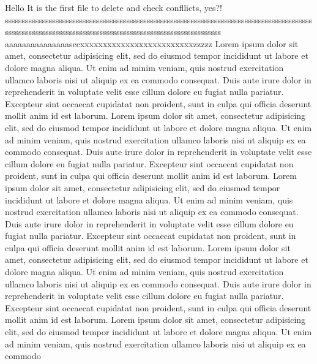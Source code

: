 Hello
It is the
first file
to delete and check confllicts, yes?!
\begin{equation}
    
\end{equation}
sssssssssssssssssssssssssssssssssssssssssssssssssssssssssssssssssssssssssssssssssssssssssssssssssssssssssssssssssssssssssssssssssssssssssssssssssssssssssss aaaaaaaaaaaaaaasccxxxxxxxxxxxxxxxxxxxxxxxxxzzzzz
       Lorem ipsum dolor sit amet, consectetur adipisicing elit, sed do eiusmod
       tempor incididunt ut labore et dolore magna aliqua. Ut enim ad minim veniam,
       quis nostrud exercitation ullamco laboris nisi ut aliquip ex ea commodo
       consequat. Duis aute irure dolor in reprehenderit in voluptate velit esse
       cillum dolore eu fugiat nulla pariatur. Excepteur sint occaecat cupidatat non
proident, sunt in culpa qui officia deserunt mollit anim id est laborum.
Lorem ipsum dolor sit amet, consectetur adipisicing elit, sed do eiusmod
tempor incididunt ut labore et dolore magna aliqua. Ut enim ad minim veniam,
       quis nostrud exercitation ullamco laboris nisi ut aliquip ex ea commodo
       consequat. Duis aute irure dolor in reprehenderit in voluptate velit esse
       cillum dolore eu fugiat nulla pariatur. Excepteur sint occaecat cupidatat non
       proident, sunt in culpa qui officia deserunt mollit anim id est laborum.
       Lorem ipsum dolor sit amet, consectetur adipisicing elit, sed do eiusmod
       tempor incididunt ut labore et dolore magna aliqua. Ut enim ad minim veniam,
       quis nostrud exercitation ullamco laboris nisi ut aliquip ex ea commodo
       consequat. Duis aute irure dolor in reprehenderit in voluptate velit esse
       cillum dolore eu fugiat nulla pariatur. Excepteur sint occaecat cupidatat non
       proident, sunt in culpa qui officia deserunt mollit anim id est laborum.
       Lorem ipsum dolor sit amet, consectetur adipisicing elit, sed do eiusmod
       tempor incididunt ut labore et dolore magna aliqua. Ut enim ad minim veniam,
       quis nostrud exercitation ullamco laboris nisi ut aliquip ex ea commodo
       consequat. Duis aute irure dolor in reprehenderit in voluptate velit esse
       cillum dolore eu fugiat nulla pariatur. Excepteur sint occaecat cupidatat non
       proident, sunt in culpa qui officia deserunt mollit anim id est laborum.
       Lorem ipsum dolor sit amet, consectetur adipisicing elit, sed do eiusmod
       tempor incididunt ut labore et dolore magna aliqua. Ut enim ad minim veniam,
       quis nostrud exercitation ullamco laboris nisi ut aliquip ex ea commodo
